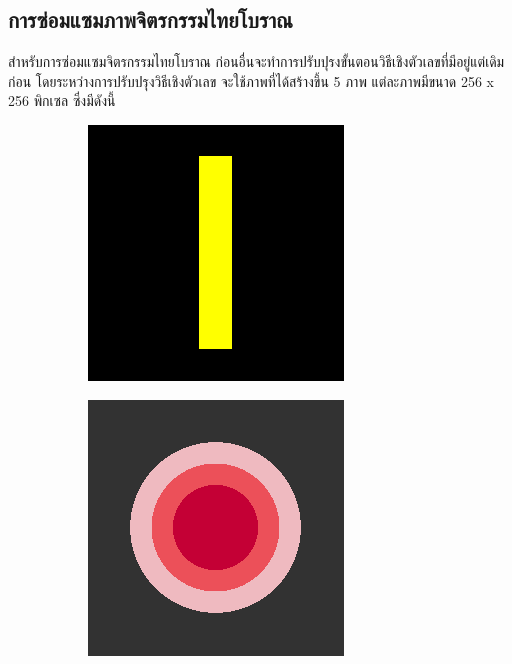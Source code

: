 \documentclass[hidelinks, a4paper,12pt]{article}
\numberwithin{equation}{section}							%
\numberwithin{equation}{section}
\begin{document}
{	\subsection{การซ่อมแซมภาพจิตรกรรมไทยโบราณ}
	\hspace{1cm} สำหรับการซ่อมแซมจิตรกรรมไทยโบราณ ก่อนอื่นจะทำการปรับปุรงขั้นตอนวิธีเชิงตัวเลขที่มีอยู่แต่เดิมก่อน โดยระหว่างการปรับปรุงวิธีเชิงตัวเลข จะใช้ภาพที่ได้สร้างขึ้น 5 ภาพ แต่ละภาพมีขนาด 256 x 256 พิกเซล ซึ่งมีดังนี้
	\begin{figure}[H]
		\centering
		\begin{subfigure}{0.4\linewidth}
			\centering
			\includegraphics[width=0.8\linewidth]{images/image_inpaint_synthetic/case01-original.png}
		\end{subfigure}
		\begin{subfigure}{0.4\linewidth}
			\centering
			\includegraphics[width=0.8\linewidth]{images/image_inpaint_synthetic/case02-original.png}

\end{subfigure}
\end{figure}}
\end{document}
